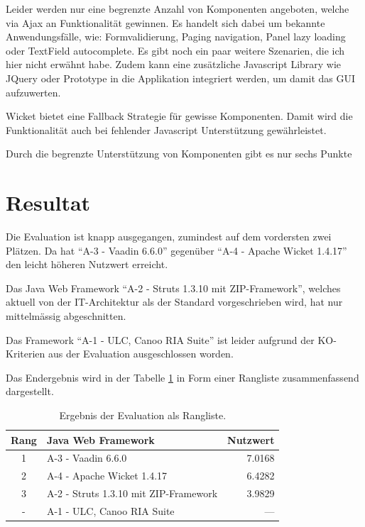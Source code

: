   Leider werden nur eine begrenzte Anzahl von Komponenten angeboten, welche
  via \ac{Ajax} an Funktionalität gewinnen. Es handelt sich dabei um bekannte
  Anwendungsfälle, wie: Formvalidierung, Paging navigation, Panel lazy loading
  oder TextField autocomplete. Es gibt noch ein paar weitere Szenarien,
  die ich hier nicht erwähnt habe. Zudem kann eine zusätzliche Javascript
  Library wie JQuery oder Prototype in die Applikation integriert werden, um
  damit das \ac{GUI} aufzuwerten.
  
  Wicket bietet eine Fallback Strategie für gewisse Komponenten. Damit wird die
  Funktionalität auch bei fehlender Javascript Unterstützung gewährleistet.
  
  Durch die begrenzte Unterstützung von Komponenten gibt es nur sechs Punkte

  \section{Resultat}
  
  Die Evaluation ist knapp ausgegangen, zumindest auf dem vordersten zwei
  Plätzen. Da hat ``A-3 - Vaadin 6.6.0'' gegenüber ``A-4 - Apache Wicket
  1.4.17'' den leicht höheren Nutzwert erreicht.
  
  Das Java Web Framework ``A-2 - Struts 1.3.10 mit ZIP-Framework'', welches
  aktuell von der IT-Architektur als der Standard vorgeschrieben wird, hat nur
  mittelmässig abgeschnitten.

  Das Framework ``A-1 - ULC, Canoo RIA Suite'' ist leider aufgrund der
  KO-Kriterien aus der Evaluation ausgeschlossen worden.
  
  Das Endergebnis wird in der Tabelle \ref{tab:ergebnisDerEvaluation} in Form
  einer Rangliste zusammenfassend dargestellt.
  \newline
  
  \begin{table}[ht]
    \sffamily 
    \begin{center}
      \begin{tabular}{clr}
        \toprule
        \textbf{Rang} & \textbf{Java Web Framework} & \textbf{Nutzwert} \\
        \midrule
        1 & A-3 - Vaadin 6.6.0 & 7.0168 \\
        2 & A-4 - Apache Wicket 1.4.17 & 6.4282 \\
        3 & A-2 - Struts 1.3.10 mit ZIP-Framework & 3.9829 \\
        - & A-1 - ULC, Canoo RIA Suite & --- \\
        \bottomrule
      \end{tabular}
      \caption{Ergebnis der Evaluation als Rangliste.}
      \label{tab:ergebnisDerEvaluation}
    \end{center}
  \end{table}
